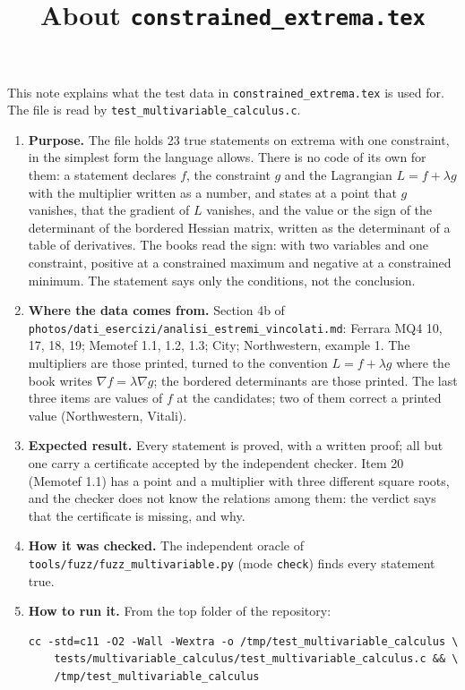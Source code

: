 \documentclass[11pt,a4paper]{article}
\title{About \texttt{constrained\_extrema.tex}}
\author{}
\date{}
\begin{document}
\maketitle
This note explains what the test data in \texttt{constrained\_extrema.tex} is used for. The file is read by \texttt{test\_multivariable\_calculus.c}.

\begin{enumerate}
\item \textbf{Purpose.} The file holds 23 true statements on extrema with one constraint, in the simplest form the language allows. There is no code of its own for them: a statement declares $f$, the constraint $g$ and the Lagrangian $L = f + \lambda g$ with the multiplier written as a number, and states at a point that $g$ vanishes, that the gradient of $L$ vanishes, and the value or the sign of the determinant of the bordered Hessian matrix, written as the determinant of a table of derivatives. The books read the sign: with two variables and one constraint, positive at a constrained maximum and negative at a constrained minimum. The statement says only the conditions, not the conclusion.

\item \textbf{Where the data comes from.} Section 4b of \texttt{photos/dati\_esercizi/analisi\_estremi\_vincolati.md}: Ferrara MQ4 10, 17, 18, 19; Memotef 1.1, 1.2, 1.3; City; Northwestern, example 1. The multipliers are those printed, turned to the convention $L = f + \lambda g$ where the book writes $\nabla f = \lambda \nabla g$; the bordered determinants are those printed. The last three items are values of $f$ at the candidates; two of them correct a printed value (Northwestern, Vitali).

\item \textbf{Expected result.} Every statement is proved, with a written proof; all but one carry a certificate accepted by the independent checker. Item 20 (Memotef 1.1) has a point and a multiplier with three different square roots, and the checker does not know the relations among them: the verdict says that the certificate is missing, and why.

\item \textbf{How it was checked.} The independent oracle of \texttt{tools/fuzz/fuzz\_multivariable.py} (mode \texttt{check}) finds every statement true.

\item \textbf{How to run it.} From the top folder of the repository:
\begin{verbatim}
cc -std=c11 -O2 -Wall -Wextra -o /tmp/test_multivariable_calculus \
    tests/multivariable_calculus/test_multivariable_calculus.c && \
    /tmp/test_multivariable_calculus
\end{verbatim}
\end{enumerate}
\end{document}
